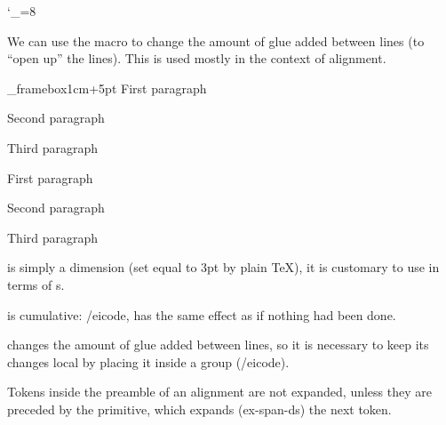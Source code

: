 {{        \catcode`\_=8
    \endtextbox

\endslide

\beginslide
    \bheadline

    \textbox\empty{1cm}{2cm}{\hsize-2cm}{}
        We can use the \macroname\openup{} macro to change the amount of glue added between lines (to ``open up'' the lines).
        This is used mostly in the context of alignment.
    \endtextbox

    \textbox\_framebox{1cm}{\lastey+5pt}{\hsize-2cm}{}
\beginhi
First paragraph

{\jot{}}

Second paragraph


Third paragraph
\endhi
    \endtextbox

    \textbox{}
        First paragraph
        
        {\jot{}}
        
        Second paragraph
        
        
        Third paragraph
    \endtextbox

\endslide

\beginslide
    \bheadline

    \textbox\empty{1cm}{2cm}{\hsize-2cm}{}
        \macroname\jot{} is simply a dimension (set equal to $3$pt by plain \TeX), it is customary to use \macroname\openup{} in
        terms of \macroname\jot s.

        \macroname\openup{} is cumulative: \icode {}\jot{}\jot/eicode, has the same effect as if nothing had been
        done.

        \macroname\openup{} changes the amount of glue added between lines, so it is necessary to keep its changes local by
        placing it inside a group (/eicode).
    \endtextbox

\endslide

\beginslide
    \bheadline

    \textbox\empty{1cm}{2cm}{\hsize-2cm}{}
        Tokens inside the preamble of an alignment are not expanded, unless they are preceded by the \macroname\span{} primitive, 
        which expands (ex-span-ds) the next token.

}}
